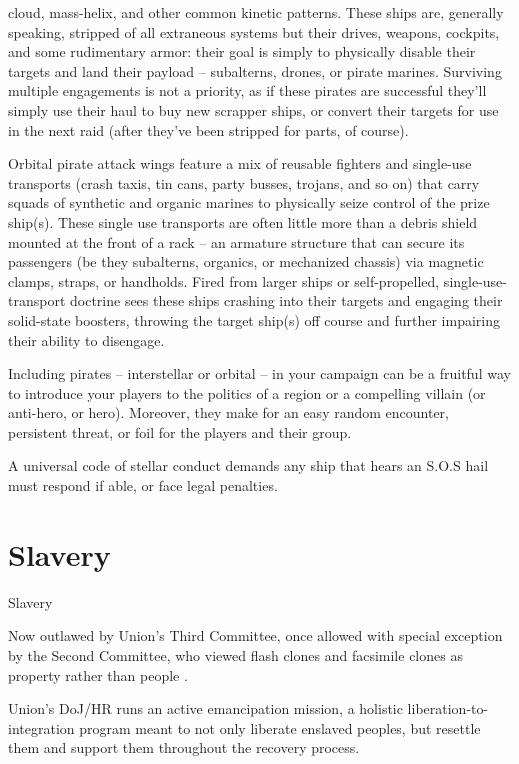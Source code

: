                                                                                                                       


cloud, mass-helix, and other common kinetic patterns. These ships are, generally speaking,  
stripped of all extraneous systems but their drives, weapons, cockpits, and some rudimentary  
armor: their goal is simply to physically disable their targets and land their payload -- subalterns,  
drones, or pirate marines. Surviving multiple engagements is not a priority, as if these pirates are  
successful they’ll simply use their haul to buy new scrapper ships, or convert their targets for use  
in the next raid (after they’ve been stripped for parts, of course).   

Orbital pirate attack wings feature a mix of reusable fighters and single-use transports (crash  
taxis, tin cans, party busses, trojans, and so on) that carry squads of synthetic and organic  
marines to physically seize control of the prize ship(s). These single use transports are often little  
more than a debris shield mounted at the front of a rack -- an armature structure that can secure  
its passengers (be they subalterns, organics, or mechanized chassis) via magnetic clamps,  
straps, or handholds. Fired from larger ships or self-propelled, single-use-transport doctrine sees  
these ships crashing into their targets and engaging their solid-state boosters, throwing the target  
ship(s) off course and further impairing their ability to disengage.   

Including pirates -- interstellar or orbital -- in your campaign can be a fruitful way to introduce your  
players to the politics of a region or a compelling villain (or anti-hero, or hero). Moreover, they  
make for an easy random encounter, persistent threat, or foil for the players and their group.    

A universal code of stellar conduct demands any ship that hears an S.O.S hail must respond if  
able, or face legal penalties.
 
\section{Slavery}
Slavery  

Now outlawed by Union’s Third Committee, once allowed with special exception by the Second  
Committee, who viewed flash clones and facsimile clones as property rather than people .  
 

Union’s DoJ/HR runs an active emancipation mission, a holistic liberation-to-integration program  
meant to not only liberate enslaved peoples, but resettle them and support them throughout the  
recovery process. 
 

